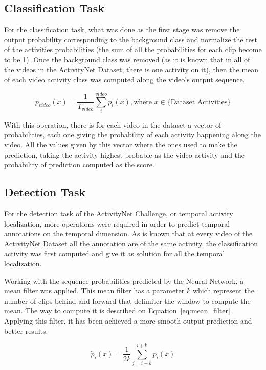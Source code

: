 \subsection{Classification Task}

For the classification task, what was done as the first stage was remove the output probability corresponding to the background class and normalize the rest of the activities probabilities (the sum of all the probabilities for each clip become to be 1). Once the background class was removed (as it is known that in all of the videos in the ActivityNet Dataset, there is one activity on it), then the mean of each video activity class was computed along the video's output sequence.

\begin{equation}
	p_{video}(x) = \frac{1}{T_{video}} \sum_i^{video} p_i(x), \text{where } x \in \{ \text{Dataset Activities}\}
\end{equation}

With this operation, there is for each video in the dataset a vector of probabilities, each one giving the probability of each activity happening along the video. All the values given by this vector where the ones used to make the prediction, taking the activity highest probable as the video activity and the probability of prediction computed as the score.

\subsection{Detection Task}

For the detection task of the ActivityNet Challenge, or temporal activity localization, more operations were required in order to predict temporal annotations on the temporal dimension. As is known that at every video of the ActivityNet Dataset all the annotation are of the same activity, the classification activity was first computed and give it as solution for all the temporal localization.

Working with the sequence probabilities predicted by the Neural Network, a mean filter was applied. This mean filter has a parameter $k$ which represent the number of clips behind and forward that delimiter the window to compute the mean. The way to compute it is described on Equation~\ref{eq:mean_filter}. Applying this filter, it has been achieved a more smooth output prediction and better results.

\begin{equation}
	\tilde{p}_i(x) = \frac{1}{2k} \sum_{j=i-k}^{i+k} p_i(x)
    \label{eq:mean_filter}
\end{equation}

